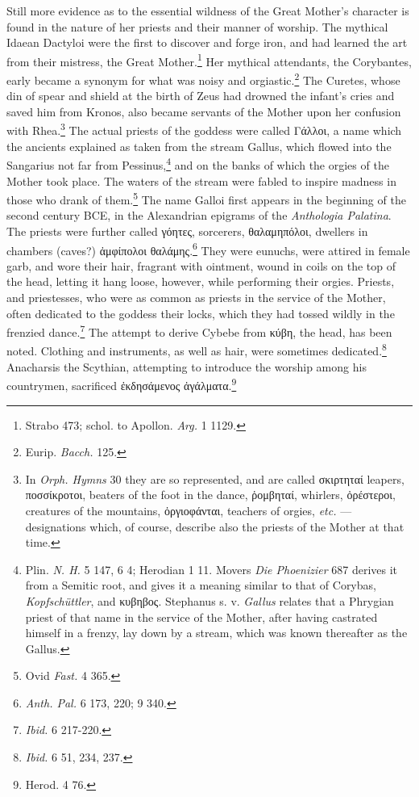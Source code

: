 \documentclass[a4paper, 11pt, oneside, polutonikogreek, french]{article}
\begin{document}
Still more evidence as to the essential wildness of the Great Mother's character is found in the nature of her priests and their manner of worship. The mythical Idaean Dactyloi were the first to discover and forge iron, and had learned the art from their mistress, the Great Mother.\footnote{Strabo 473; schol. to Apollon. \emph{Arg.} 1 1129.} Her mythical attendants, the Corybantes, early became a synonym for what was noisy and orgiastic.\footnote{Eurip. \emph{Bacch.} 125.} The Curetes, whose din of spear and shield at the birth of Zeus had drowned the infant's cries and saved him from Kronos, also became servants of the Mother upon her confusion with Rhea.\footnote{In \emph{Orph. Hymns} 30 they are so represented, and are called σκιρτηταί leapers, ποσσίκροτοι, beaters of the foot in the dance, ῥομβηταί, whirlers, ὀρέστεροι, creatures of the mountains, ὀργιοφάνται, teachers of orgies, \emph{etc.} --- designations which, of course, describe also the priests of the Mother at that time.} The actual priests of the goddess were called Γάλλοι, a name which the ancients explained as taken from the stream Gallus, which flowed into the Sangarius not far from Pessinus,\footnote{Plin. \emph{N. H.} 5 147, 6 4; Herodian 1 11. Movers \emph{Die Phoenizier} 687 derives it from a Semitic root, and gives it a meaning similar to that of Corybas, \emph{Kopfschüttler}, and κυβηβος. Stephanus s. v. \emph{Gallus} relates that a Phrygian priest of that name in the service of the Mother, after having castrated himself in a frenzy, lay down by a stream, which was known thereafter as the Gallus.} and on the banks of which the orgies of the Mother took place. The waters of the stream were fabled to inspire madness in those who drank of them.\footnote{Ovid \emph{Fast.} 4 365.} The name Galloi first appears in the beginning of the second century \textsc{BCE}, in the Alexandrian epigrams of the \emph{Anthologia Palatina}. The priests were further called γόητες, sorcerers, θαλαμηπόλοι, dwellers in chambers (caves?) ἀμφίπολοι θαλάμης.\footnote{\emph{Anth. Pal.} 6 173, 220; 9 340.} They were eunuchs, were attired in female garb, and wore their hair, fragrant with ointment, wound in coils on the top of the head, letting it hang loose, however, while performing their orgies. Priests, and priestesses, who were as common as priests in the service of the Mother, often dedicated to the goddess their locks, which they had tossed wildly in the frenzied dance.\footnote{\emph{Ibid.} 6 217-220.} The attempt to derive Cybebe from κύβη, the head, has been noted. Clothing and instruments, as well as hair, were sometimes dedicated.\footnote{\emph{Ibid.} 6 51, 234, 237.} Anacharsis the Scythian, attempting to introduce the worship among his countrymen, sacrificed ἐκδησάμενος ἀγάλματα.\footnote{Herod. 4 76.}
\end{document}
